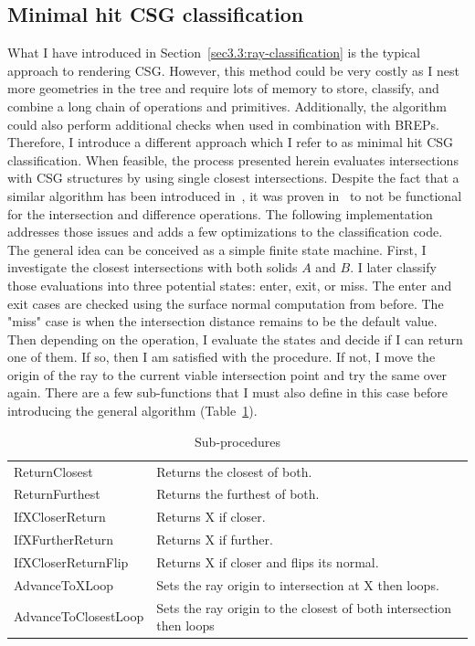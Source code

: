 \documentclass[a4paper,11pt,oneside]{article}
\begin{document}
\subsection{Minimal hit CSG classification}
\label{section:classification-optimization}


What I have introduced in Section~\ref{sec3.3:ray-classification} is the typical approach to rendering CSG. However, this method could be very costly as I nest more geometries in the tree and require lots of memory to store, classify, and combine a long chain of operations and primitives. Additionally, the algorithm could also perform additional checks when used in combination with BREPs. Therefore, I introduce a different approach which I refer to as minimal hit CSG classification. When feasible, the process presented herein evaluates intersections with CSG structures by using single closest intersections. Despite the fact that a similar algorithm has been introduced in~\cite{kensler_ray_2006}, it was proven in~\cite{csg-xrt-renderer} to not be functional for the intersection and difference operations. The following implementation addresses those issues and adds a few optimizations to the classification code. The general idea can be conceived as a simple finite state machine. First, I investigate the closest intersections with both solids $A$ and $B$. I later classify those evaluations into three potential states: enter, exit, or miss. The enter and exit cases are checked using the surface normal computation from before. The "miss" case is when the intersection distance remains to be the default value. Then depending on the operation, I evaluate the states and decide if I can return one of them. If so, then I am satisfied with the procedure. If not, I move the origin of the ray to the current viable intersection point and try the same over again. 
There are a few sub-functions that I must also define in this case before introducing the general algorithm (Table~\ref{table:procedure-details}).

\begin{table}[H]
	\caption{Sub-procedures}
	\label{table:procedure-details}
	\begin{tabularx}{\textwidth}{p{}X}
		\toprule
		ReturnClosest        & Returns the closest of both.                                       \\
		ReturnFurthest       & Returns the furthest of both.                                      \\
		IfXCloserReturn      & Returns X if closer.                                               \\
		IfXFurtherReturn     & Returns X if further.                                              \\
		IfXCloserReturnFlip  & Returns X if closer and flips its normal.                          \\
		AdvanceToXLoop       & Sets the ray origin to intersection at X then loops.               \\
		AdvanceToClosestLoop & Sets the ray origin to the closest of both intersection then loops \\
		\bottomrule
	\end{tabularx}
\end{table}
\end{document}
